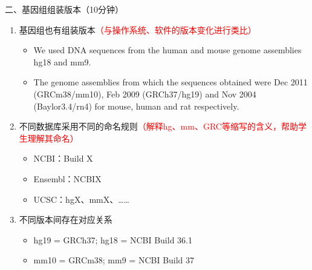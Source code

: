 \documentclass{TIJMUjiaoanLL}
\begin{document}
\vspace*{0.2cm}
\noindent
二、基因组组装版本（10分钟）
\begin{enumerate}
  \item 基因组也有组装版本\textcolor{red}{（与操作系统、软件的版本变化进行类比）}
    \begin{itemize}
      \item We used DNA sequences from the human and mouse genome assemblies hg18 and mm9.
      \item The genome assemblies from which the sequences obtained were Dec 2011 (GRCm38/mm10), Feb 2009 (GRCh37/hg19) and Nov 2004 (Baylor3.4/rn4) for mouse, human and rat respectively.
  \end{itemize}
  \item 不同数据库采用不同的命名规则\textcolor{red}{（解释hg、mm、GRC等缩写的含义，帮助学生理解其命名）}
     \begin{itemize}
       \item NCBI：Build X
       \item Ensembl：NCBIX
       \item UCSC：hgX、mmX、……
     \end{itemize}
  \item 不同版本间存在对应关系
    \begin{itemize}
       \item hg19 = GRCh37; hg18 = NCBI Build 36.1
       \item mm10 = GRCm38; mm9 = NCBI Build 37
    \end{itemize}
\end{enumerate}
\end{document}
